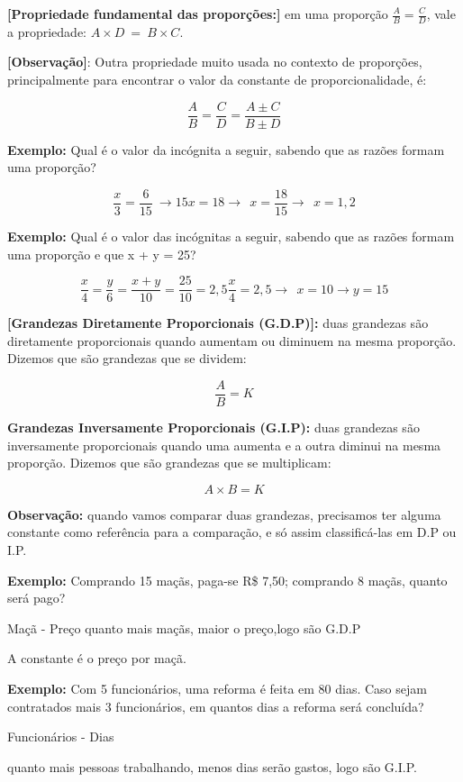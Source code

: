 \textbf{{[}Propriedade fundamental das proporções:{]}} em uma proporção
$\frac{A}{B} = \frac{C}{D}$, vale a propriedade:
$A \times D\  = \ B \times C$.

\textbf{{[}Observação{]}}: Outra propriedade muito usada no contexto de
proporções, principalmente para encontrar o valor da constante de
proporcionalidade, é:

$$\frac{A}{B} = \frac{C}{D} = \frac{A \pm C}{B \pm D}$$

\textbf{Exemplo:} Qual é o valor da incógnita a seguir, sabendo que as
razões formam uma proporção?

$$\frac{x}{3} = \frac{6}{15}\  \rightarrow 15x = 18 \rightarrow \ \ x = \frac{18}{15} \rightarrow \ \ x = 1,2$$

\textbf{Exemplo:} Qual é o valor das incógnitas a seguir, sabendo que as
razões formam uma proporção e que x + y = 25?

$$\frac{x}{4} = \frac{y}{6} = \frac{x + y}{10} = \frac{25}{10} = 2,5\frac{x}{4} = 2,5 \rightarrow \ \ x = 10 \rightarrow y = 15$$

\textbf{{[}Grandezas Diretamente Proporcionais (G.D.P){]}:} duas
grandezas são diretamente proporcionais quando aumentam ou diminuem na
mesma proporção. Dizemos que são grandezas que se dividem:

$$\frac{A}{B} = K$$

\textbf{{Grandezas Inversamente Proporcionais (G.I.P)}:} duas grandezas
são inversamente proporcionais quando uma aumenta e a outra diminui na
mesma proporção. Dizemos que são grandezas que se multiplicam:

$$A \times B = K$$

\textbf{Observação:} quando vamos comparar duas grandezas, precisamos
ter alguma constante como referência para a comparação, e só assim
classificá-las em D.P ou I.P.

\textbf{Exemplo:} Comprando 15 maçãs, paga-se R\$ 7,50; comprando 8
maçãs, quanto será pago?

Maçã - Preço \rightarrow quanto mais maçãs, maior o preço,logo são G.D.P

A constante é o preço por maçã.

\textbf{Exemplo:} Com 5 funcionários, uma reforma é feita em 80 dias.
Caso sejam contratados mais 3 funcionários, em quantos dias a reforma
será concluída?

Funcionários - Dias

quanto mais pessoas trabalhando, menos dias serão gastos, logo são G.I.P.

